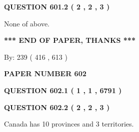 \documentclass[12pt]{article}
\begin{document}
\vspace{0.2in}
  
{\textbf{\Large{QUESTION
601.2 
 ( 2 , 2 , 3 )
}}}
  
  
 
 
\noindent{}
 
 
 None of above.
 
 
 
 
   
   
 \vspace{0.2in}
 
   
   
   
   
\vspace{1.0in} 
{\textbf{\large{ *** END OF PAPER, THANKS *** }}} 
   
   
\hspace{1.0in} By: 
 239 ( 416 ,  613 )
   
   
   
   
\newpage 
\setcounter{page}{ 
   602001 } 
   
   
   
   
 {\textbf{ \Large{ PAPER NUMBER  602  }}}
   
   
\vspace{0.2in}
   
   
   
   
   
   
 \vspace{0.2in}
 
 
 
 
   
   
  
\vspace{0.2in}
  
{\textbf{\Large{QUESTION
602.1 
 ( 1 , 1 , 6791 )
}}}
  
  
  
\vspace{0.2in}
  
{\textbf{\Large{QUESTION
602.2 
 ( 2 , 2 , 3 )
}}}
  
  
 
 
\noindent{}
 
 
Canada has 10  provinces and 3 territories.
 
\end{document}
